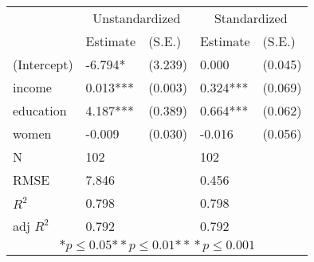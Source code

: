\begin{tabular}{*{5}{l}}
\hline
                  & \multicolumn{2}{c}{Unstandardized} & \multicolumn{2}{c}{Standardized}   \tabularnewline
                   &Estimate  &(S.E.)    &Estimate  &(S.E.)  \tabularnewline
 \hline
 \hline
   (Intercept)     &-6.794*   &   (3.239) &0.000   &   (0.045) \tabularnewline
   income          &0.013***   &   (0.003) &0.324***   &   (0.069) \tabularnewline
   education       &4.187***   &   (0.389) &0.664***   &   (0.062) \tabularnewline
   women           &-0.009   &   (0.030) &-0.016   &   (0.056) \tabularnewline
 \hline
 N                 &102       &        &102       &        \tabularnewline
 RMSE             &7.846         & &0.456         & \tabularnewline
 $R^2$             &0.798         & &0.798         & \tabularnewline
 adj $R^2$         &0.792         & &0.792         & \tabularnewline
 \hline
\hline
 
 \multicolumn{5}{c}{${*  p}\le 0.05$${*\!\!*  p}\le 0.01$${*\!\!*\!\!*  p}\le 0.001$}\tabularnewline
 \end{tabular}